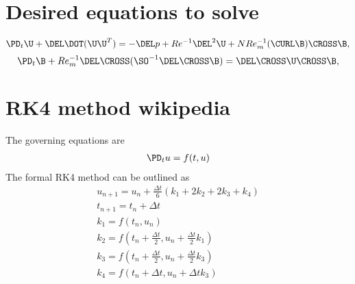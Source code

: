 \documentclass[11pt]{article}
\newcommand{\ReInv}{Re^{-1}}
\newcommand{\RemInv}{Re_m^{-1}}
\newcommand{\Al}{N Re_m^{-1}}
\begin{document}
\doublespacing
\MOONSTITLE

\section{Desired equations to solve}
\begin{equation}
  \PD_t \U + \DEL \DOT (\U \U^T)
  = - \DEL p + \ReInv \DEL^2 \U \\ + \Al
  (\CURL \B) \CROSS \B,
\end{equation} \noindent
\begin{equation}
  \PD_t \B + \RemInv \DEL \CROSS ( \SO^{-1} \DEL \CROSS \B ) = \DEL \CROSS \U \CROSS \B,
\end{equation}

\section{RK4 method wikipedia}
The governing equations are
\begin{equation}\begin{aligned}
  \PD_t u = f(t,u) \\
\end{aligned}\end{equation}
The formal RK4 method can be outlined as
\begin{equation}\begin{aligned}
  u_{n+1} = u_n + \frac{\Delta t}{6} (k_1 + 2 k_2 + 2k_3 + k_4) \\
  t_{n+1} = t_n + \Delta t \\
  k_1 = f(t_n,u_n) \\
  k_2 = f\left(t_n + \frac{\Delta t}{2} , u_n + \frac{\Delta t}{2} k_1 \right) \\
  k_3 = f\left(t_n + \frac{\Delta t}{2} , u_n + \frac{\Delta t}{2} k_3 \right) \\
  k_4 = f\left(t_n + \Delta t , u_n + \Delta t k_3 \right) \\
\end{aligned}\end{equation}
\end{document}
